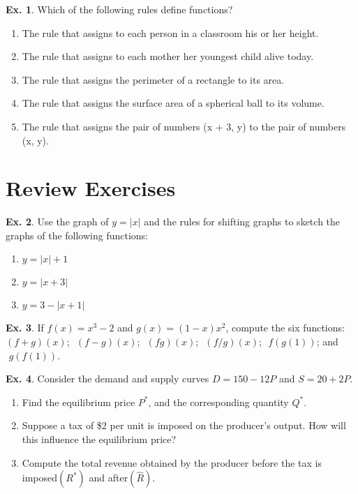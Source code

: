 \documentclass[10pt,a4paper]{book}
\theoremstyle{definition}\newtheorem{definition}{Definition}
\theoremstyle{definition}\newtheorem{fact}{Fact}
\theoremstyle{definition}\newtheorem{ex}{Ex.}
\theoremstyle{definition}\newtheorem{project}{Project}
\theoremstyle{definition}\newtheorem{problem}{Problem}
\theoremstyle{definition}\newtheorem{example}{Example}
\numberwithin{theorem}{chapter}
\numberwithin{corollary}{chapter}
\numberwithin{assumption}{chapter}
\numberwithin{definition}{chapter}
\numberwithin{prop}{chapter}
\numberwithin{notation}{chapter}
\numberwithin{problem}{chapter}
\numberwithin{example}{chapter}
\numberwithin{fact}{chapter}
\numberwithin{ex}{chapter}
\begin{document}
	\begin{ex}
		Which of the following rules define functions?
		\begin{enumerate}[label=(\alph*)]
			\item The rule that assigns to each person in a classroom his or her height.
			\item The rule that assigns to each mother her youngest child alive today.
			\item The rule that assigns the perimeter of a rectangle to its area.
			\item The rule that assigns the surface area of a spherical ball to its volume.
			\item The rule that assigns the pair of numbers (x + 3, y) to the pair of numbers (x, y).
		\end{enumerate}
	\end{ex}
	
	\section{Review Exercises}
	\begin{ex}
		Use the graph of $y=|x|$ and the rules for shifting graphs to sketch the graphs of the following functions:
		\begin{enumerate}[label=(\alph*)]
			\item $y=|x|+1$
			\item $y=|x+3|$
			\item $y=3-|x+1|$
		\end{enumerate}
	\end{ex}
	
	\begin{ex}
		If $f (x) = x^3 - 2$ and $g(x) = (1 - x)x^2$, compute the six functions:
		$(f + g)(x)$; $\,\,(f - g)(x)$; $\,\,(fg)(x)$; $\,\,(f/g)(x)$; $\,\,f(g(1))$; and $\,\,g(f(1))$.
	\end{ex}
	
	\begin{ex}
		Consider the demand and supply curves $D=150- 12P$ and $S=20+2P$.
		\begin{enumerate}[label=(\alph*)]
			\item Find the equilibrium price $P^*$, and the corresponding quantity $Q^*$.
			\item Suppose a tax of \$2 per unit is imposed on the producer’s output. How will this influence the equilibrium price?
			\item Compute the total revenue obtained by the producer before the tax is imposed$(R^*)$ and after$(\hat{R})$.
		\end{enumerate}
	\end{ex}
	
\end{document}
